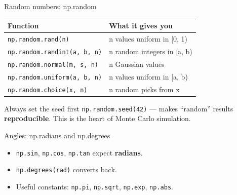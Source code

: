 \documentclass[aspectratio=169]{beamer}
\begin{document}
\begin{frame}{Random numbers: np.random}
  \begin{table}
    \small
    \begin{tabular}{@{}ll@{}}
      \toprule
      Function & What it gives you \\
      \midrule
      \texttt{np.random.rand(n)} & n values uniform in [0, 1) \\
      \texttt{np.random.randint(a, b, n)} & n random integers in [a, b) \\
      \texttt{np.random.normal(m, s, n)} & n Gaussian values \\
      \texttt{np.random.uniform(a, b, n)} & n values uniform in [a, b) \\
      \texttt{np.random.choice(x, n)} & n random picks from x \\
      \bottomrule
    \end{tabular}
  \end{table}
  \vspace{0.3cm}
  \begin{alertblock}{Always set the seed first}
    \texttt{np.random.seed(42)} --- makes ``random'' results \textbf{reproducible}.
    This is the heart of Monte Carlo simulation.
  \end{alertblock}
\end{frame}

\begin{frame}{Angles: np.radians and np.degrees}
  \begin{center}
  \end{center}
  \vspace{0.3cm}
  \begin{itemize}
    \item \texttt{np.sin}, \texttt{np.cos}, \texttt{np.tan} expect \textbf{radians}.
    \item \texttt{np.degrees(rad)} converts back.
    \item Useful constants: \texttt{np.pi}, \texttt{np.sqrt}, \texttt{np.exp}, \texttt{np.abs}.
  \end{itemize}
\end{frame}
\end{document}
